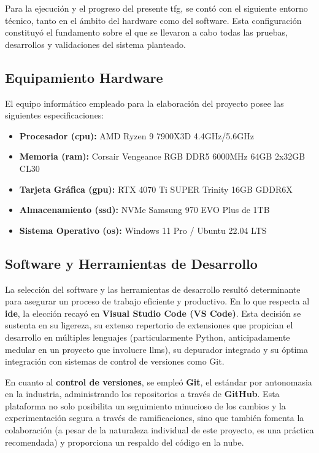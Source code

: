 Para la ejecución y el progreso del presente \gls{tfg}, se contó con el siguiente entorno técnico, tanto en el ámbito del hardware como del software. Esta configuración constituyó el fundamento sobre el que se llevaron a cabo todas las pruebas, desarrollos y validaciones del sistema planteado.

\subsection{Equipamiento Hardware}
El equipo informático empleado para la elaboración del proyecto posee las siguientes especificaciones:
\begin{itemize}
    \item \textbf{Procesador (\gls{cpu}):} AMD Ryzen 9 7900X3D 4.4GHz/5.6GHz
    \item \textbf{Memoria (\gls{ram}):} Corsair Vengeance RGB DDR5 6000MHz 64GB 2x32GB CL30
    \item \textbf{Tarjeta Gráfica (\gls{gpu}):} RTX 4070 Ti SUPER Trinity 16GB GDDR6X
    \item \textbf{Almacenamiento (\gls{ssd}):} NVMe Samsung 970 EVO Plus de 1TB
    \item \textbf{Sistema Operativo (\gls{os}):} Windows 11 Pro / Ubuntu 22.04 LTS
\end{itemize}

\subsection{Software y Herramientas de Desarrollo}
\label{subsec:software_herramientas}

La selección del software y las herramientas de desarrollo resultó determinante para asegurar un proceso de trabajo eficiente y productivo. En lo que respecta al \textbf{\gls{ide}}, la elección recayó en \textbf{Visual Studio Code (VS Code)}. Esta decisión se sustenta en su ligereza, su extenso repertorio de extensiones que propician el desarrollo en múltiples lenguajes (particularmente Python, anticipadamente medular en un proyecto que involucre \glspl{llm}), su depurador integrado y su óptima integración con sistemas de control de versiones como Git.

En cuanto al \textbf{control de versiones}, se empleó \textbf{Git}, el estándar por antonomasia en la industria, administrando los repositorios a través de \textbf{GitHub}. Esta plataforma no solo posibilita un seguimiento minucioso de los cambios y la experimentación segura a través de ramificaciones, sino que también fomenta la colaboración (a pesar de la naturaleza individual de este proyecto, es una práctica recomendada) y proporciona un respaldo del código en la nube.

